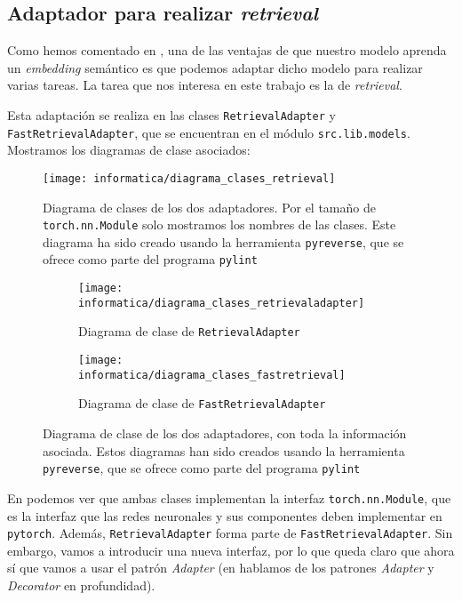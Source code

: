 \subsection{Adaptador para realizar \textit{retrieval}} \label{isubs:impl_retr_adapter}

Como hemos comentado en , una de las ventajas de que nuestro modelo aprenda un \textit{embedding} semántico es que podemos adaptar dicho modelo para realizar varias tareas. La tarea que nos interesa en este trabajo es la de \textit{retrieval}.

Esta adaptación se realiza en las clases \lstinline{RetrievalAdapter} y \lstinline{FastRetrievalAdapter}, que se encuentran en el módulo \lstinline{src.lib.models}. Mostramos los diagramas de clase asociados:

\begin{figure}[H]
    \centering
    \texttt{[image: informatica/diagrama\_clases\_retrieval]}
    \caption{Diagrama de clases de los dos adaptadores. Por el tamaño de \lstinline{torch.nn.Module} solo mostramos los nombres de las clases. Este diagrama ha sido creado usando la herramienta \lstinline{pyreverse}, que se ofrece como parte del programa \lstinline{pylint}}
    \label{img:diagrama_clases_global_adaptadores}
\end{figure}

\begin{figure}[H]
\centering
    \ajustarsubcaptions
    \begin{subfigure}{.6\textwidth}
        \centering
        \texttt{[image: informatica/diagrama\_clases\_retrievaladapter]}
        \caption{Diagrama de clase de \lstinline{RetrievalAdapter}}
    \end{subfigure}%
    \begin{subfigure}{.4\textwidth}
        \centering
        \texttt{[image: informatica/diagrama\_clases\_fastretrieval]}
        \caption{Diagrama de clase de \lstinline{FastRetrievalAdapter}}
    \end{subfigure}
\caption{Diagrama de clase de los dos adaptadores, con toda la información asociada. Estos diagramas han sido creados usando la herramienta \lstinline{pyreverse}, que se ofrece como parte del programa \lstinline{pylint}}
\label{img:diagramas_clase_concretos_adaptadores}
\end{figure}

En  podemos ver que ambas clases implementan la interfaz \lstinline{torch.nn.Module}, que es la interfaz que las redes neuronales y sus componentes deben implementar en \lstinline{pytorch}. Además, \lstinline{RetrievalAdapter} forma parte de \lstinline{FastRetrievalAdapter}. Sin embargo, vamos a introducir una nueva interfaz, por lo que queda claro que ahora sí que vamos a usar el patrón \textit{Adapter} (en  hablamos de los patrones \textit{Adapter} y \textit{Decorator} en profundidad).

